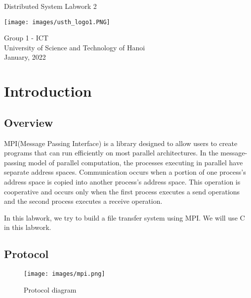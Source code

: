 \documentclass[13pt]{article}
\begin{document}
\begin{titlepage}
    \begin{center}
        \vspace*{1.8cm}
        \Large
        Distributed System Labwork 2\\
        \Large
        \vspace{0.5cm}
        \begin{center}
            \texttt{[image: images/usth\_logo1.PNG]}
        \end{center}  
        \vspace{0.5cm}
            Group 1 - ICT\\
        \vspace{0.5cm}
            University of Science and Technology of Hanoi\\
        \vspace{0.5cm}
            January, 2022
        \vfill
          
   \end{center}
\end{titlepage}

\newpage
\tableofcontents
\newpage


\section{Introduction}
\subsection{Overview}
\noindent%
MPI(Message Passing Interface) is a library designed to allow users to create programs that can run efficiently on most parallel architectures. In the message-passing model of parallel computation, the processes executing in parallel have separate address spaces. Communication occurs when a portion of one process’s address space is copied into another process’s address space. This operation is cooperative and occurs only when the first process executes a send
operations and the second process executes a receive operation.\cite{MPI Concept}

\noindent%
In this labwork, we try to build a file transfer system using MPI. We will use C in this labwork.


\subsection{Protocol}
\begin{figure}[h]
    \centering
    \texttt{[image: images/mpi.png]}
    \caption{Protocol diagram}
    \label{fig:protocol}
\end{figure}
\end{document}
